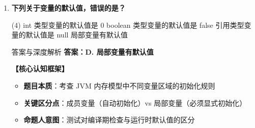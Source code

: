 \documentclass[12pt, a4paper]{ctexart}
\newcommand{\code}[1]{\texttt{#1}}
\begin{document}
\begin{enumerate}[label=\textbf{\arabic*.}, leftmargin=*, itemsep=1.5em]
\begin{bluebox}{答案与深度解析}
\textbf{【应背诵知识点】}
\begin{itemize}[leftmargin=*, nosep]
    \item \code{package} 定义包，\code{import} 引入类
    \item \code{java.lang} 包自动导入，无需显式 \code{import}
\end{itemize}
\end{bluebox}

\item \textbf{下列关于变量的默认值，错误的是？}
\begin{tasks}(4)
    \task int 类型变量的默认值是 0 \task boolean 类型变量的默认值是 false
    \task 引用类型变量的默认值是 null \task 局部变量有默认值
\end{tasks}
\begin{bluebox}{答案与深度解析}
\textbf{答案：D. 局部变量有默认值}

\textbf{【核心认知框架】}
\begin{itemize}[leftmargin=*, nosep]
    \item \textbf{题目本质}：考查 JVM 内存模型中不同变量区域的初始化规则
    \item \textbf{关键区分点}：成员变量（自动初始化）vs 局部变量（必须显式初始化）
    \item \textbf{命题人意图}：测试对编译期检查与运行时默认值的区分
\end{itemize}


\end{bluebox}
\end{enumerate}
\end{document}
